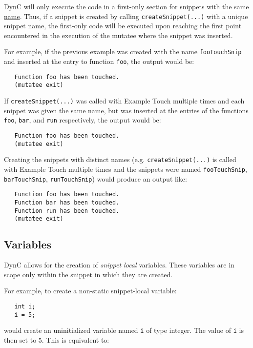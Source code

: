 \documentclass{article}
\begin{document}
DynC will only execute the code in a first-only section for snippets \underline{with the same name}. Thus, if a snippet is created by calling \verb!createSnippet(...)! with a unique snippet name, the first-only code will be executed upon reaching the first point encountered in the execution of the mutatee where the snippet was inserted. 

For example, if the previous example was created with the name \verb!fooTouchSnip! and inserted at the entry to function \verb!foo!, the output would be:
\begin{lstlisting}
   Function foo has been touched.
   (mutatee exit)
\end{lstlisting}

If \verb!createSnippet(...)! was called with Example Touch multiple times and each snippet was given the same name, but was inserted at the entries of the functions \verb!foo!, \verb!bar!, and \verb!run! respectively, the output would be:

\begin{lstlisting}
   Function foo has been touched.
   (mutatee exit)
\end{lstlisting}

Creating the snippets with distinct names (e.g. \verb!createSnippet(...)! is called with Example Touch multiple times and the snippets were named \verb!fooTouchSnip!, \verb!barTouchSnip!, \verb!runTouchSnip!) would produce an output like:

\begin{lstlisting}
   Function foo has been touched.
   Function bar has been touched.
   Function run has been touched.
   (mutatee exit)
\end{lstlisting}

\subsection{Variables}
DynC allows for the creation of \textit{snippet local} variables. These variables are in scope only within the snippet in which they are created.

\noindent For example, to create a non-static snippet-local variable:

\begin{lstlisting}
   int i;
   i = 5;
\end{lstlisting}

\noindent would create an uninitialized variable named \verb!i! of type integer. The value of \verb!i! is then set to 5.
This is equivalent to:
\end{document}
